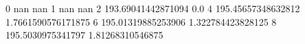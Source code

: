 0 nan nan
1 nan nan
2 193.69041442871094 0.0
4 195.45657348632812 1.7661590576171875
6 195.01319885253906 1.322784423828125
8 195.5030975341797 1.81268310546875
